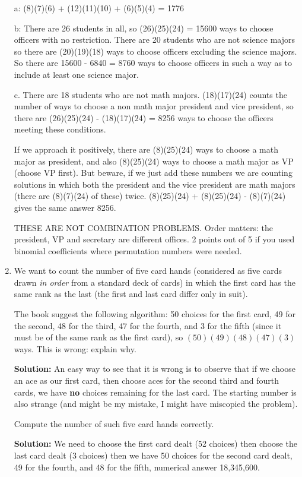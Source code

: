 \documentclass[12pt]{article}
\begin{document}
\begin{enumerate}
a:  (8)(7)(6) + (12)(11)(10) + (6)(5)(4) = 1776

b:  There are 26 students in all, so (26)(25)(24) = 15600 ways to choose officers with no restriction.  There are 20 students who are not science majors so there are (20)(19)(18) ways to choose officers excluding the science majors.
So there are 15600 - 6840 = 8760 ways to choose officers in such a way as to include at least one science major.

c.  There are 18 students who are not math majors.  (18)(17)(24) counts the number of ways to choose a non math major president and vice president, so there are (26)(25)(24) - (18)(17)(24) = 8256 ways to choose the officers meeting these conditions.  

If we approach it positively, there are (8)(25)(24) ways to choose a math major as president, and also
(8)(25)(24) ways to choose a math major as VP (choose VP first).  But beware, if we just add these numbers
we are counting solutions in which both the president and the vice president are math majors (there are (8)(7)(24) of these) twice.  (8)(25)(24) + (8)(25)(24) - (8)(7)(24) gives the same answer 8256.

THESE ARE NOT COMBINATION PROBLEMS.  Order matters:  the president, VP and secretary are different offices.  2 points out of 5 if you used binomial coefficients where permutation numbers were needed.

\newpage

\item  We want to count the number of five card hands (considered as five cards drawn {\em in order\/} from a standard deck of cards) in which the first card has the same rank as the last (the first and last card differ only in suit).

The book suggest the following algorithm:  50 choices for the first card, 49 for the second, 48 for the third, 47 for the fourth,
and 3 for the fifth (since it must be of the same rank as the first card), so $(50)(49)(48)(47)(3)$ ways.  This is wrong:
explain why.

{\bf Solution:}  An easy way to see that it is wrong is to observe that if we choose an ace as our first card, then choose aces for the second third and fourth cards, we have {\bf no} choices remaining for the last card.  The starting number is also strange (and might be my mistake, I might have miscopied the problem).

Compute the number of such five card hands correctly.

{\bf Solution:}  We need to choose the first card dealt (52 choices) then choose the last card dealt (3 choices) then we have 50 choices for the second card dealt, 49 for the fourth, and 48 for the fifth, numerical answer 18,345,600.


\end{enumerate}
\end{document}
